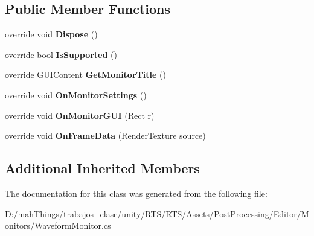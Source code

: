\subsection*{Public Member Functions}
\begin{DoxyCompactItemize}
\item 
\mbox{\label{class_unity_editor_1_1_post_processing_1_1_waveform_monitor_aa30204365ee9ccf878ecd5e5dafd06d8}} 
override void {\bfseries Dispose} ()
\item 
\mbox{\label{class_unity_editor_1_1_post_processing_1_1_waveform_monitor_aa2c30e921275f59d61d0f50d3804a306}} 
override bool {\bfseries Is\+Supported} ()
\item 
\mbox{\label{class_unity_editor_1_1_post_processing_1_1_waveform_monitor_a71cc6ab9e9d57a73451cdb0e86d25b79}} 
override G\+U\+I\+Content {\bfseries Get\+Monitor\+Title} ()
\item 
\mbox{\label{class_unity_editor_1_1_post_processing_1_1_waveform_monitor_a68311f67e6546f64f01f825bd0cdff5a}} 
override void {\bfseries On\+Monitor\+Settings} ()
\item 
\mbox{\label{class_unity_editor_1_1_post_processing_1_1_waveform_monitor_acdc2fa129a9020c11b49e4ed3c47f80d}} 
override void {\bfseries On\+Monitor\+G\+UI} (Rect r)
\item 
\mbox{\label{class_unity_editor_1_1_post_processing_1_1_waveform_monitor_a8a2597c0eedeeb0f5451ca10edc1c241}} 
override void {\bfseries On\+Frame\+Data} (Render\+Texture source)
\end{DoxyCompactItemize}
\subsection*{Additional Inherited Members}


The documentation for this class was generated from the following file\+:\begin{DoxyCompactItemize}
\item 
D\+:/mah\+Things/trabajos\+\_\+clase/unity/\+R\+T\+S/\+R\+T\+S/\+Assets/\+Post\+Processing/\+Editor/\+Monitors/Waveform\+Monitor.\+cs\end{DoxyCompactItemize}
